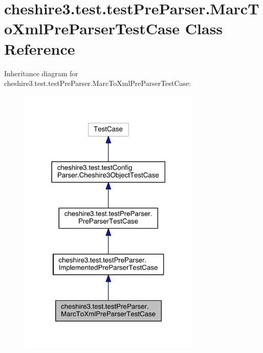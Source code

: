 \hypertarget{classcheshire3_1_1test_1_1test_pre_parser_1_1_marc_to_xml_pre_parser_test_case}{\section{cheshire3.\-test.\-test\-Pre\-Parser.\-Marc\-To\-Xml\-Pre\-Parser\-Test\-Case Class Reference}
\label{classcheshire3_1_1test_1_1test_pre_parser_1_1_marc_to_xml_pre_parser_test_case}
}


Inheritance diagram for cheshire3.\-test.\-test\-Pre\-Parser.\-Marc\-To\-Xml\-Pre\-Parser\-Test\-Case\-:
\nopagebreak
\begin{figure}[H]
\begin{center}
\leavevmode
\includegraphics[width=246pt]{classcheshire3_1_1test_1_1test_pre_parser_1_1_marc_to_xml_pre_parser_test_case__inherit__graph}
\end{center}
\end{figure}


